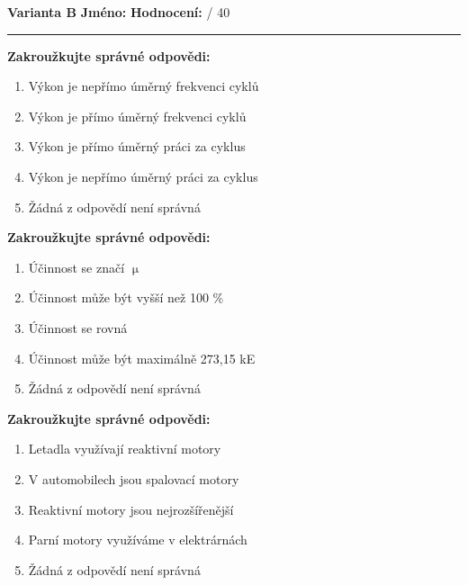 \documentclass[../main.tex]{subfiles}
\begin{document}
\pagestyle{empty}

\textbf{Varianta B}
\hfill
\textbf{Jméno:}
\tecky{6cm}
\hspace{0.5cm}
\textbf{Hodnocení:}
\tecky{0.5cm}
{/}
{40}
\vspace{0.25cm}
\hrule
\vspace{0.25cm}

\begin{enumerate}[label={\textbf{\arabic*.}}]
\begin{minipage}{0.45\textwidth}
    \item \textbf{Zakroužkujte správné odpovědi:}
        \begin{enumerate}[label={\alph*)}, itemsep=0pt, topsep=0.15cm]
            \item {Výkon je nepřímo úměrný frekvenci cyklů}
            \item {Výkon je přímo úměrný frekvenci cyklů}
            \item {Výkon je přímo úměrný práci za cyklus}
            \item {Výkon je nepřímo úměrný práci za cyklus}
            \item {Žádná z odpovědí není správná}
        \end{enumerate}

    \item \textbf{Zakroužkujte správné odpovědi:}
        \begin{enumerate}[label={\alph*)}, itemsep=0pt, topsep=0.15cm]
            \item {Účinnost se značí \(\upmu\)}
            \item {Účinnost může být vyšší než 100 \%}
            \item {Účinnost se rovná }
            \item {Účinnost může být maximálně 273,15 kE}
            \item {Žádná z odpovědí není správná}
        \end{enumerate}

    \item \textbf{Zakroužkujte správné odpovědi:}
        \begin{enumerate}[label={\alph*)}, itemsep=0pt, topsep=0.15cm]
            \item {Letadla využívají reaktivní motory}
            \item {V automobilech jsou spalovací motory}
            \item {Reaktivní motory jsou nejrozšířenější}
            \item {Parní motory využíváme v elektrárnách}
            \item {Žádná z odpovědí není správná}
        \end{enumerate}


\end{minipage}
\end{enumerate}
\end{document}
